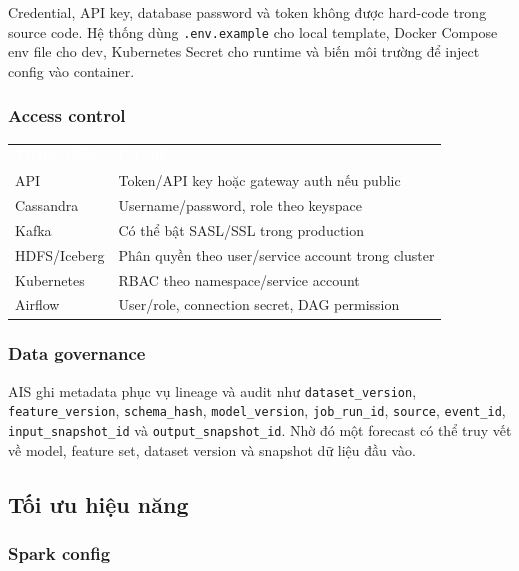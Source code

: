 \documentclass[12pt,a4paper]{article}
\begin{document}
Credential, API key, database password và token không được hard-code trong source code. Hệ thống dùng \texttt{.env.example} cho local template, Docker Compose env file cho dev, Kubernetes Secret cho runtime và biến môi trường để inject config vào container.

\subsubsection{Access control}\label{access-control}

\begin{longtable}[]{@{}ll@{}}
\arrayrulecolor{HUSTBlue}\toprule\noalign{}
\rowcolor{HUSTBlue}
\textcolor{white}{\textbf{Thành phần}} & \textcolor{white}{\textbf{Cơ chế}} \\
\arrayrulecolor{HUSTBlue}\midrule\noalign{}
\endhead
\bottomrule\noalign{}
\endlastfoot
API & Token/API key hoặc gateway auth nếu public \\
Cassandra & Username/password, role theo keyspace \\
Kafka & Có thể bật SASL/SSL trong production \\
HDFS/Iceberg & Phân quyền theo user/service account trong cluster \\
Kubernetes & RBAC theo namespace/service account \\
Airflow & User/role, connection secret, DAG permission \\
\end{longtable}

\subsubsection{Data governance}\label{data-governance}

AIS ghi metadata phục vụ lineage và audit như \texttt{dataset\_version}, \texttt{feature\_version}, \texttt{schema\_hash}, \texttt{model\_version}, \texttt{job\_run\_id}, \texttt{source}, \texttt{event\_id}, \texttt{input\_snapshot\_id} và \texttt{output\_snapshot\_id}. Nhờ đó một forecast có thể truy vết về model, feature set, dataset version và snapshot dữ liệu đầu vào.

\subsection{Tối ưu hiệu năng}\label{tux1ed1i-ux1b0u-hiux1ec7u-nux103ng}

\subsubsection{Spark config}\label{spark-config}
\end{document}
